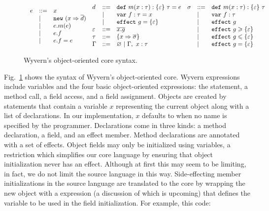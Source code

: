 \begin{figure}[htb]
\footnotesize{
\[
\begin{array}{lll}
\begin{array}{lllr}
e & ::= & x \\
& | & \mathtt{new}~(x \Rightarrow \overline{d}) \\
& | & e.m(e)\\
& | & e.f \\
& | & e.f = e 
\end{array}
\begin{array}{lllr}
d & ::= & \mathtt{def}~ m(x : \tau) : \{ \varepsilon \}~\tau = e \\
  & |   & \mathtt{var}~ f : \tau = x\\
& |   & \mathtt{effect}~ g = \{ \varepsilon \} \\
\varepsilon & ::= & \overline{x.g} \\
\tau & ::= & \{ x \Rightarrow \overline{\sigma} \} \\
\Gamma & :: = & \varnothing~|~\Gamma,~x : \tau 
\end{array}
\begin{array}{lllr}
\sigma & ::= & \mathtt{def}~ m(x : \tau) : \{ \varepsilon \}~\tau \\
       & |   & \mathtt{var}~ f: \tau\\
       & |   & \mathtt{effect}~ g \\
       & |   & \mathtt{effect}~ g \geqslant \{ \varepsilon \} \\
       & |   & \mathtt{effect}~ g \leqslant \{ \varepsilon \} \\
       & |   & \mathtt{effect}~ g = \{ \varepsilon \} 
\end{array}
\end{array}
\]
}
\caption{Wyvern's object-oriented core syntax.}
\label{f-syntax}
\end{figure}




Fig.~\ref{f-syntax} shows the syntax of Wyvern's object-oriented core. Wyvern expressions include variables and the four basic object-oriented expressions: the  statement, a method call, a field access, and a field assignment. Objects are created by  statements that contain a variable $x$ representing the current object along with a list of declarations.  In our implementation, $x$ defaults to  when no name is specified by the programmer.  Declarations come in three kinds: a method declaration, a field, and an effect member. Method declarations are annotated with a set of effects. Object fields may only be initialized using variables, a restriction which simplifies our core language by ensuring that object initialization never has an effect. Although at first this may seem to be limiting, in fact, we do not limit the source language in this way. Side-effecting member initializations in the source language are translated to the core by wrapping the new object with a  expression (a discussion of which is upcoming) that defines the variable to be used in the field initialization. For example, this code:

